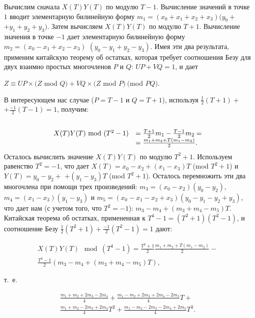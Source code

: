 \documentclass{mai_book}
\begin{document}
Вычислим сначала $X(T)Y(T)$ по модулю $T - 1$. Вычисление значений в точке $1$ вводит элементарную билинейную форму $m_1 = (x_0 + x_1 + x_2 + x_3)(y_0 + $ $+y_1 + y_2 + y_3)$. Затем вычисляем $X(T)Y(T)$ по модулю $T + 1$. Вычисление значения в точке $-1$ дает элементарную билинейную форму $m_2 = (x_0 - x_1 + x_2 - x_3)$ $(y_0 - y_1 + y_2 - y_3)$. Имея эти два результата, применим китайскую теорему об остатках, которая требует соотношения Безу для двух взаимно простых многочленов $P$ и $Q$: $UP + VQ = 1$, и дает
\begin{center}
  $Z \equiv UP \times (Z$ mod $Q) + VQ \times (Z$ mod $P)\ ($mod $PQ).$
  \end{center}\noindent
В интересующем нас случае ($P = T - 1$ и $Q = T + 1$), используя $\frac{1}{2}(T + 1) + $ $+\frac{-1}{2}(T - 1) = 1$, получим:\par
$$
\begin{array}{rl}
 \\
X(T)Y(T)\ \textup{mod} \ (T^2 - 1) & = \frac{T + 1}{2}m_1 - \frac{T - 1}{2}m_2 =
\\
& = \frac{m_1 + m_2 + T(m_1 - m_2)}{2}.
\\
\end{array}
$$
\noindent
Осталось вычислить значение $X(T)Y(T)$ по модулю $T^2 + 1$. Используем равенство $T^2 = -1$, что дает $X(T) = x_0 - x_2 + (x_1 - x_3)T$ (mod $T^2 + 1$) и $Y(T) = y_0 - y_2 + $ $+(y_1 - y_3)T$ (mod $T^2 + 1$). Осталось перемножить эти два многочлена при помощи трех произведений: $m_3 = (x_0 - x_2)(y_0 - y_2)$, $m_4 = (x_1 - x_3)(y_1 - y_3)$ и $m_5 = (x_0 - x_1 - x_2 + x_3)(y_0 - y_1 - y_2 + y_3)$, что дает нам (с учетом того, что $T^2 = -1$): $m_3 - m_4 + (m_3 + m_4 - m_5)T$. Китайская теорема об остатках, примененная к $T^4 - 1 = (T^2 + 1)(T^2 - 1)$, и соотношение Безу $\frac{1}{2}(T^2+1)+ \frac{-1}{2}(T^2-1)=1$ дают:
\begin{center}
\begin{multline*}
  X(T)Y(T) \mod (T^4-1)= \frac{T^2+1}{2}\frac{m_1+m_2+T(m_1-m_2)}{2}-\\ \frac{T^2-1}{2}(m_3-m_4+(m_3+m_4-m_5)T),
\end{multline*}
\end{center}
т.~е.
\begin{center}
\begin{multline*}
  \frac{m_1+m_2+2m_3-2m_4}{4}+ \frac{m_1-m_2+2m_3+2m_4-2m_5}{4}T+ \\ \frac{m_1+m_2-2m_3+2m_4}{4}T^2+ \frac{m_1-m_2-2m_3-2m_4+2m_5}{4}T^3.
\end{multline*}
  \end{center}\par
\end{document}

